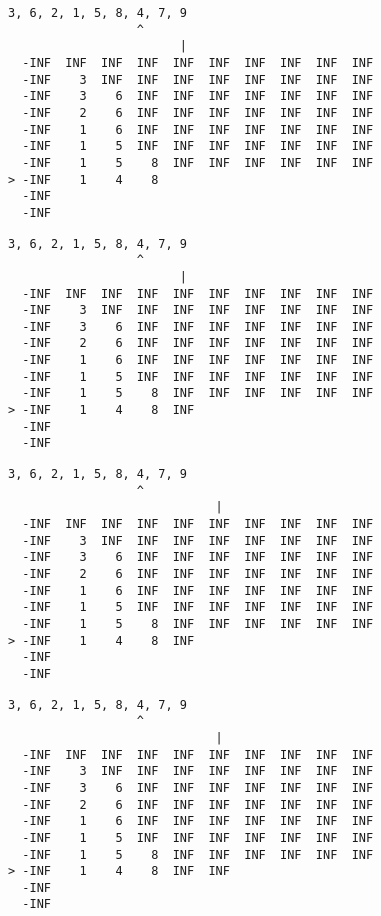 { \begin{verbatim}
3, 6, 2, 1, 5, 8, 4, 7, 9
                  ^
                        |
  -INF  INF  INF  INF  INF  INF  INF  INF  INF  INF
  -INF    3  INF  INF  INF  INF  INF  INF  INF  INF
  -INF    3    6  INF  INF  INF  INF  INF  INF  INF
  -INF    2    6  INF  INF  INF  INF  INF  INF  INF
  -INF    1    6  INF  INF  INF  INF  INF  INF  INF
  -INF    1    5  INF  INF  INF  INF  INF  INF  INF
  -INF    1    5    8  INF  INF  INF  INF  INF  INF
> -INF    1    4    8                              
  -INF                                             
  -INF                                             
\end{verbatim} }

{ \begin{verbatim}
3, 6, 2, 1, 5, 8, 4, 7, 9
                  ^
                        |
  -INF  INF  INF  INF  INF  INF  INF  INF  INF  INF
  -INF    3  INF  INF  INF  INF  INF  INF  INF  INF
  -INF    3    6  INF  INF  INF  INF  INF  INF  INF
  -INF    2    6  INF  INF  INF  INF  INF  INF  INF
  -INF    1    6  INF  INF  INF  INF  INF  INF  INF
  -INF    1    5  INF  INF  INF  INF  INF  INF  INF
  -INF    1    5    8  INF  INF  INF  INF  INF  INF
> -INF    1    4    8  INF                         
  -INF                                             
  -INF                                             
\end{verbatim} }

{ \begin{verbatim}
3, 6, 2, 1, 5, 8, 4, 7, 9
                  ^
                             |
  -INF  INF  INF  INF  INF  INF  INF  INF  INF  INF
  -INF    3  INF  INF  INF  INF  INF  INF  INF  INF
  -INF    3    6  INF  INF  INF  INF  INF  INF  INF
  -INF    2    6  INF  INF  INF  INF  INF  INF  INF
  -INF    1    6  INF  INF  INF  INF  INF  INF  INF
  -INF    1    5  INF  INF  INF  INF  INF  INF  INF
  -INF    1    5    8  INF  INF  INF  INF  INF  INF
> -INF    1    4    8  INF                         
  -INF                                             
  -INF                                             
\end{verbatim} }

{ \begin{verbatim}
3, 6, 2, 1, 5, 8, 4, 7, 9
                  ^
                             |
  -INF  INF  INF  INF  INF  INF  INF  INF  INF  INF
  -INF    3  INF  INF  INF  INF  INF  INF  INF  INF
  -INF    3    6  INF  INF  INF  INF  INF  INF  INF
  -INF    2    6  INF  INF  INF  INF  INF  INF  INF
  -INF    1    6  INF  INF  INF  INF  INF  INF  INF
  -INF    1    5  INF  INF  INF  INF  INF  INF  INF
  -INF    1    5    8  INF  INF  INF  INF  INF  INF
> -INF    1    4    8  INF  INF                    
  -INF                                             
  -INF                                             
\end{verbatim} }

